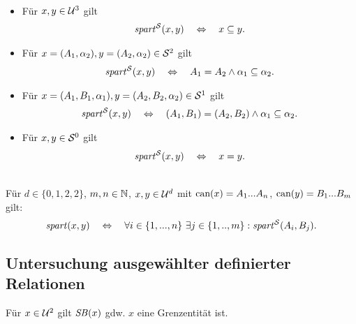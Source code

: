 \begin{dfn}[$\Gspart^\einf$]\ 
    \begin{itemize}
        \item Für $x,y \in \mathcal{U}^3$ gilt
            \begin{align*}
                \mathit{spart}^{\mathcal{S}}(x,y) 
                \quad \Leftrightarrow \quad 
                x \subseteq y.
            \end{align*}
        \item Für $x = (A_1,\alpha_2), y = (A_2,\alpha_2) \in \mathcal{S}^2$ gilt
            \begin{align*}
                \mathit{spart}^{\mathcal{S}}(x,y) 
                \quad \Leftrightarrow \quad 
                A_1 = A_2 \land \alpha_1 \subseteq \alpha_2.
            \end{align*}
        \item Für $x = (A_1,B_1,\alpha_1), y = (A_2,B_2,\alpha_2) \in \mathcal{S}^1$ gilt
            \begin{align*}
                \mathit{spart}^{\mathcal{S}}(x,y) 
                \quad \Leftrightarrow \quad 
                (A_1, B_1) = (A_2,B_2) \land \alpha_1 \subseteq \alpha_2.
            \end{align*}
        \item Für $x, y \in \mathcal{S}^0$ gilt
            \begin{align*}
                \mathit{spart}^{\mathcal{S}}(x,y) 
                \quad \Leftrightarrow \quad 
                x=y.
            \end{align*}
    \end{itemize}
\end{dfn}


\begin{dfn}[$\Gspart$]\ \\
    Für $d \in \{0,1,2,2\}$, $m,n \in \mathbb{N}$, $x,y \in \mathcal{U}^d$ mit $\text{can}(x) = A_1 ... A_n$, $\text{can}(y) = B_1 ... B_m$ gilt:
    $$\mathit{spart}(x,y) \quad \Leftrightarrow \quad \forall i \in \{1, ..., n\}\ \exists j \in \{1, .., m\}: \mathit{spart}^{\mathcal{S}}(A_i,B_j). $$
\end{dfn}


\subsection{Untersuchung ausgewählter definierter Relationen}

\begin{satz}
    Für $x \in \mathcal{U}^2$ gilt $\mathit{S\hspace*{-0.25ex}B}(x)$ gdw. $x$ eine Grenzentität ist.
\end{satz}

